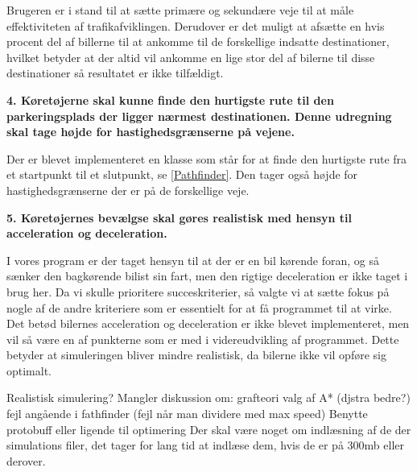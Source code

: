 Brugeren er i stand til at sætte primære og sekundære veje til at måle effektiviteten af trafikafviklingen. Derudover er det muligt at afsætte en hvis procent del af billerne til at ankomme til de forskellige indsatte destinationer, hvilket betyder at der altid vil ankomme en lige stor del af bilerne til disse destinationer så resultatet er ikke tilfældigt.

\vspace{5mm}

\textbf{4. Køretøjerne skal kunne finde den hurtigste rute til den parkeringsplads der ligger nærmest destinationen. Denne udregning skal tage højde for hastighedsgrænserne på vejene.}

Der er blevet implementeret en klasse som står for at finde den hurtigste rute fra et startpunkt til et slutpunkt, se \ref{Pathfinder}. Den tager også højde for hastighedsgrænserne der er på de forskellige veje. 

\vspace{5mm}

\textbf{5. Køretøjernes bevælgse skal gøres realistisk med hensyn til acceleration og deceleration.}

I vores program er der taget hensyn til at der er en bil kørende foran, og så sænker den bagkørende bilist sin fart, men den rigtige deceleration er ikke taget i brug her. Da vi skulle prioritere succeskriterier, så valgte vi at sætte fokus på nogle af de andre kriteriere som er essentielt for at få programmet til at virke. Det betød bilernes acceleration og deceleration er ikke blevet implementeret, men vil så være en af punkterne som er med i videreudvikling af programmet. Dette betyder at simuleringen bliver mindre realistisk, da bilerne ikke vil opføre sig optimalt.

\vspace{5mm}

Realistisk simulering?
Mangler diskussion om:
grafteori
valg af A* (djstra bedre?)
fejl angående i fathfinder (fejl når man dividere med max speed)
Benytte protobuff eller ligende til optimering
Der skal være noget om indlæsning af de der simulations filer, det tager for lang tid at indlæse dem, hvis de er på 300mb eller derover.